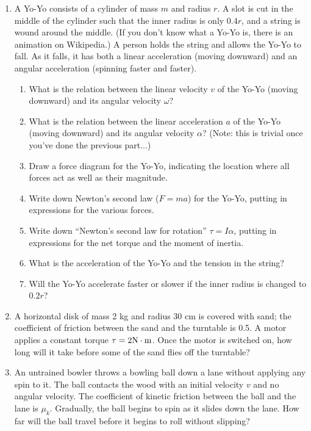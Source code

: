 \documentclass[12pt]{article}
\begin{document}
\begin{enumerate}
   \item{A Yo-Yo consists of a cylinder of mass $m$ and radius $r$. A slot is cut in the middle of the cylinder such that the inner radius is only $0.4r$, and a string is wound around the middle. (If you don't know what a Yo-Yo is, there is an animation on Wikipedia.)
     A person holds the string and allows the Yo-Yo to fall. As it falls, it has both a linear acceleration (moving downward) and an angular acceleration (spinning faster and faster).}
     \begin{enumerate}
       \item{What is the relation between the linear velocity $v$ of the Yo-Yo (moving downward) and its angular velocity $\omega$?}
       \item{What is the relation between the linear acceleration $a$ of the Yo-Yo (moving downward) and its angular velocity $\alpha$? (Note: this is trivial once you've done the previous part...)}
       \item{Draw a force diagram for the Yo-Yo, indicating the location where all forces act as well as their magnitude.}
       \item{Write down Newton's second law ($F=ma$) for the Yo-Yo, putting in expressions for the various forces.}
       \item{Write down ``Newton's second law for rotation'' $\tau = I \alpha$, putting in expressions for the net torque and the moment of inertia.}
       \item{What is the acceleration of the Yo-Yo and the tension in the string?}
       \item{Will the Yo-Yo accelerate faster or slower if the inner radius is changed to $0.2r$?}
     \end{enumerate}

   \item{A horizontal disk of mass 2 kg and radius 30 cm is covered with sand; the coefficient of friction between the sand and the turntable is 0.5. A motor applies a constant torque $\tau = 2 \rm N \cdot \rm m$. Once the motor is switched on, how long will it 
     take before some of the sand flies off the turntable?}

   \item{An untrained bowler throws a bowling ball down a lane without applying any spin to it. The ball contacts the wood with an initial velocity $v$ and no angular velocity. The coefficient of kinetic friction between the ball and the lane is $\mu_k$. 
     Gradually, the ball begins to spin as it slides down the lane. How far will the ball travel before it begins to roll without slipping?
     
}
\end{enumerate}
\end{document}
